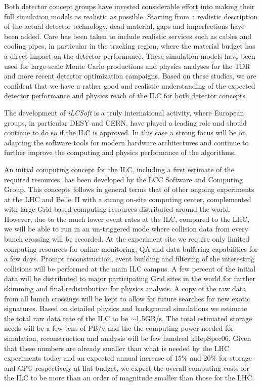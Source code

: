 \documentclass[%
 reprint,
 amsmath,amssymb,
 aps,
]{revtex4-1}
\begin{document}

Both detector concept groups have invested considerable effort into making their full simulation models as realistic as possible.
Starting from a realistic description of the actual detector technology, dead material, gaps and imperfections have been added.
Care has been taken to include realistic services such as cables and cooling pipes, in particular in the tracking region, where
the material budget has a direct impact on the detector performance.
These simulation models have been used for large-scale Monte Carlo productions and physics analyses for the TDR and more recent detector optimization
campaigns. Based on these studies, we are confident that we have a rather good and realistic understanding of the expected detector performance and physics
reach of the ILC for both detector concepts.

The development of \emph{iLCSoft} is a truly international activity, where European groups, in particular DESY and
CERN, have played a leading role and should continue to do so if the ILC is approved. In this case
a strong focus will be on adapting the software tools for modern hardware architectures and continue to
further improve the computing and physics performance of the algorithms.


An initial computing concept for the ILC, including a first estimate of the required resources, has been developed by the LCC Software and Computing Group.
This concepts follows in general terms that of other ongoing experiments at the LHC and Belle~II with a strong on-site computing center, complemented with large
Grid-based computing resources distributed around the world. However, due to the much lower event rates at the ILC, compared to the LHC, we will be
able to run in an un-triggered mode where collision data from every bunch crossing will be recorded. At the experiment site we require only limited computing
resources for online monitoring, QA and data buffering capabilities for a few days. Prompt reconstruction, event building and filtering of the interesting collisions
will be performed at the main ILC campus.
A few percent of the initial data will be distributed to major participating Grid sites
in the world for further skimming and final redistribution for physics analysis. A copy of the raw data from all bunch crossings will be kept to allow for future searches for new exotic signatures. 
Based on detailed physics and background simulations we estimate the total raw data rate of the ILC to be $\sim$1.5GB/s.
The total estimated storage needs will be a few tens of PB/y and
the the computing power needed for simulation, reconstruction and analysis will be few hundred kHepSpec06.
Given that these numbers are already smaller than what is needed by the LHC experiments today and an expected annual increase of 15\% and 20\% for storage and CPU
respectively at flat budget, we expect the overall computing costs for the ILC to be more than an order of magnitude smaller than those for the LHC.
\end{document}
